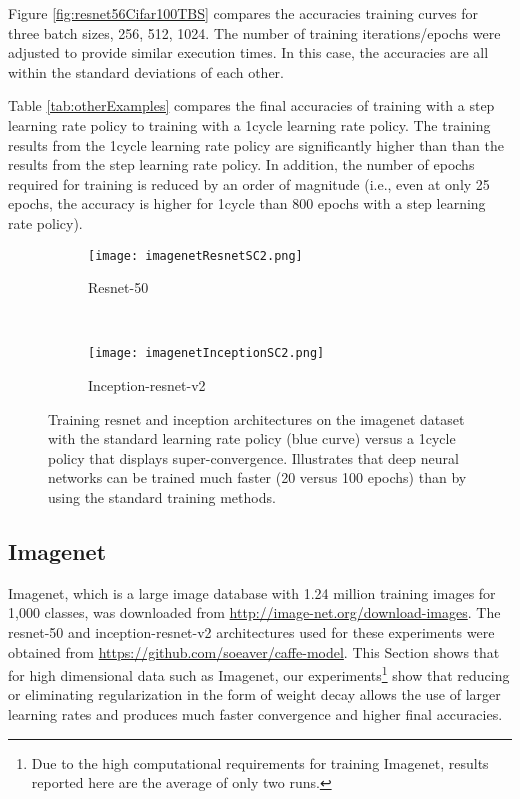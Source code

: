\documentclass{article} %
\begin{document}
Figure \ref{fig:resnet56Cifar100TBS} compares the accuracies training curves for three batch sizes, 256, 512, 1024.  The number of training iterations/epochs were adjusted to provide similar execution times.  In this case, the accuracies are all within the standard deviations of each other.

Table \ref{tab:otherExamples} compares the final accuracies of training with a step learning rate policy to training with a 1cycle learning rate policy.  The training results from the 1cycle learning rate policy are significantly higher than than the results from the step learning rate policy.  In addition, the number of epochs required for training is reduced by an order of magnitude (i.e., even at only 25 epochs, the accuracy is higher for 1cycle than 800 epochs with a step learning rate policy).



\begin{figure}[tbh]
	\centering
	\begin{subfigure}[b]{0.47\textwidth}
		\texttt{[image: imagenetResnetSC2.png]}
		\caption{Resnet-50}
		\label{fig:imagenetResnetSC}       %
	\end{subfigure}
	\quad
	\hfill
	~ %
	\centering
	\begin{subfigure}[b]{0.46\textwidth}
		\texttt{[image: imagenetInceptionSC2.png]}
		\caption{Inception-resnet-v2}
		\label{fig:imagenetInceptionSC}       %
	\end{subfigure}
	\caption{Training resnet and inception architectures on the imagenet dataset with the standard learning rate policy (blue curve) versus a 1cycle policy that displays super-convergence.  Illustrates that deep neural networks can be trained much faster (20 versus 100 epochs) than by using the standard training methods.}
	\label{fig:imagenetResnet}
	\vspace{-5pt}	
\end{figure}


\subsection{Imagenet}
\label{sec:imagenet}

Imagenet, which is a large image database with 1.24 million training images for 1,000 classes, was downloaded from \url{http://image-net.org/download-images}.  The resnet-50 and inception-resnet-v2 architectures used for these experiments were obtained from \url{https://github.com/soeaver/caffe-model}.  
This Section shows that for high dimensional data such as Imagenet, our experiments\footnote{Due to the high computational requirements for training Imagenet, results reported here are the average of only two runs.} show that reducing or eliminating regularization in the form of weight decay allows the use of larger learning rates and produces much faster convergence and higher final accuracies.  
\end{document}
